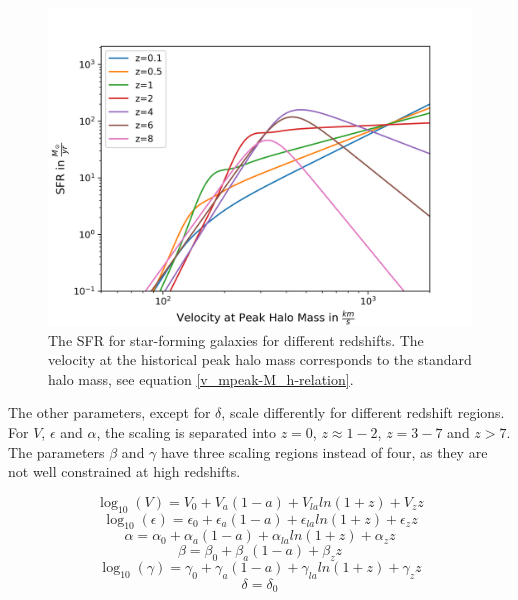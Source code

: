 \begin{figure}
    \centering
    \includegraphics[width=1\linewidth]{Images/sfr_of_v.png}
    \caption[The SFR for star-forming galaxies for different redshifts.]{The SFR for star-forming galaxies for different redshifts. The velocity at the historical peak halo mass corresponds to the standard halo mass, see equation \ref{v_mpeak-M_h-relation}.}
    \label{SFR_of_v}
\end{figure} 

The other parameters, except for $\delta$, scale differently for different redshift regions. For $V$, $\epsilon$ and $\alpha$, the scaling is separated into $z=0$, $z\approx 1-2$, $z=3-7$ and $z>7$. The parameters $\beta$ and $\gamma$ have three scaling regions instead of four, as they are not well constrained at high redshifts. 

\begin{equation}
    \log_{10}(V) = V_0 + V_a(1-a)+V_{la}ln(1+z)+V_z z
\end{equation}
\begin{equation}
    \log_{10}(\epsilon) = \epsilon_0 + \epsilon_a(1-a)+\epsilon_{la}ln(1+z)+\epsilon_z z
\end{equation}
\begin{equation}
    \alpha = \alpha_0 + \alpha_a(1-a)+\alpha_{la}ln(1+z)+\alpha_z z
\end{equation}
\begin{equation}
    \beta = \beta_0 + \beta_a(1-a)+\beta_z z
\end{equation}
\begin{equation}
    \log_{10}(\gamma) = \gamma_0 + \gamma_a(1-a)+\gamma_{la}ln(1+z)+\gamma_z z
\end{equation}
\begin{equation}
    \delta = \delta_0
\end{equation}



